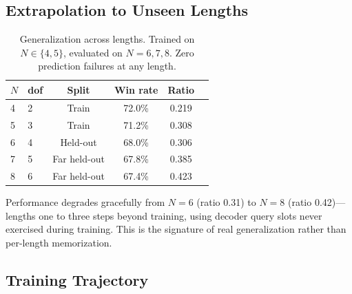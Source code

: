 \documentclass[11pt, a4paper]{article}
\begin{document}
\subsection{Extrapolation to Unseen Lengths}

\begin{table}[t]
\centering
\caption{%
  Generalization across lengths. Trained on $N \in \{4, 5\}$, evaluated on
  $N = 6, 7, 8$. Zero prediction failures at any length.%
}
\label{tab:lengths}
\begin{tabular}{llcccc}
\toprule
$N$ & \textbf{dof} & \textbf{Split} & \textbf{Win rate} &
  \textbf{Ratio} \\
\midrule
4 & 2 & Train           & 72.0\% & 0.219 \\
5 & 3 & Train           & 71.2\% & 0.308 \\
6 & 4 & Held-out        & 68.0\% & 0.306 \\
7 & 5 & Far held-out    & 67.8\% & 0.385 \\
8 & 6 & Far held-out    & 67.4\% & 0.423 \\
\bottomrule
\end{tabular}
\end{table}

Performance degrades gracefully from $N = 6$ (ratio 0.31) to $N = 8$
(ratio 0.42)---lengths one to three steps beyond training, using decoder
query slots never exercised during training. This is the signature of
real generalization rather than per-length memorization.


\subsection{Training Trajectory}
\end{document}

